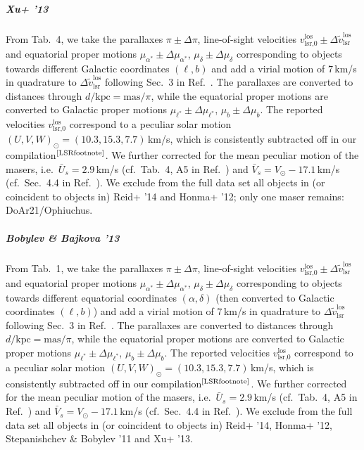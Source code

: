 \documentclass[twocolumn,prd,reprint,preprintnumbers,amsmath,amssymb,superscriptaddress,nofootinbib]{revtex4}
\begin{document}
\subparagraph{Xu+ '13 \cite{Xu2013}} From Tab.~4, we take the parallaxes $\pi\pm \Delta \pi$, line-of-sight velocities $v_{\textrm{lsr,0}}^{\textrm{los}}\pm \Delta \tilde{v}_{\textrm{lsr}}^{\textrm{los}}$ and equatorial proper motions $\mu_{\alpha^\ast}\pm \Delta \mu_{\alpha^\ast}$, $\mu_\delta\pm \Delta \mu_\delta$ corresponding to objects towards different Galactic coordinates $(\ell,b)$ and add a virial motion of $7\,$km/s in quadrature to $\Delta \tilde{v}_{\textrm{lsr}}^{\textrm{los}}$ following Sec.~3 in Ref.~\cite{Reid2009}. The parallaxes are converted to distances through $d/\textrm{kpc}=\textrm{mas}/\pi$, while the equatorial proper motions are converted to Galactic proper motions $\mu_{\ell^\ast}\pm \Delta \mu_{\ell^\ast}$, $\mu_b\pm \Delta \mu_b$. The reported velocities $v_{\textrm{lsr,0}}^{\textrm{los}}$ correspond to a peculiar solar motion $(U,V,W)_{\odot}=(10.3,15.3,7.7)\,$km/s, which is consistently subtracted off in our compilation$^\text{\ref{LSRfootnote}}$. We further corrected for the mean peculiar motion of the masers, i.e.~$\bar{U}_s=2.9\,$km/s (cf.~Tab.~4, A5 in Ref.~\cite{Reid2014}) and $\bar{V}_s=V_\odot-17.1\,$km/s (cf.~Sec.~4.4 in Ref.~\cite{Reid2014}). We exclude from the full data set all objects in (or coincident to objects in) Reid+ '14 and Honma+ '12; only one maser remains: DoAr21/Ophiuchus.


\subparagraph{Bobylev \& Bajkova '13 \cite{BobylevBajkova2013}} From Tab.~1, we take the parallaxes $\pi\pm \Delta \pi$, line-of-sight velocities $v_{\textrm{lsr,0}}^{\textrm{los}}\pm \Delta \tilde{v}_{\textrm{lsr}}^{\textrm{los}}$ and equatorial proper motions $\mu_{\alpha^\ast}\pm \Delta \mu_{\alpha^\ast}$, $\mu_\delta\pm \Delta \mu_\delta$ corresponding to objects towards different equatorial coordinates $(\alpha,\delta)$ (then converted to Galactic coordinates $(\ell,b)$) and add a virial motion of $7\,$km/s in quadrature to $\Delta \tilde{v}_{\textrm{lsr}}^{\textrm{los}}$ following Sec.~3 in Ref.~\cite{Reid2009}. The parallaxes are converted to distances through $d/\textrm{kpc}=\textrm{mas}/\pi$, while the equatorial proper motions are converted to Galactic proper motions $\mu_{\ell^\ast}\pm \Delta \mu_{\ell^\ast}$, $\mu_b\pm \Delta \mu_b$. The reported velocities $v_{\textrm{lsr,0}}^{\textrm{los}}$ correspond to a peculiar solar motion $(U,V,W)_{\odot}=(10.3,15.3,7.7)\,$km/s, which is consistently subtracted off in our compilation$^\text{\ref{LSRfootnote}}$. We further corrected for the mean peculiar motion of the masers, i.e.~$\bar{U}_s=2.9\,$km/s (cf.~Tab.~4, A5 in Ref.~\cite{Reid2014}) and $\bar{V}_s=V_\odot-17.1\,$km/s (cf.~Sec.~4.4 in Ref.~\cite{Reid2014}). We exclude from the full data set all objects in (or coincident to objects in) Reid+ '14, Honma+ '12, Stepanishchev \& Bobylev '11 and Xu+ '13.




%
%
%

\end{document}
